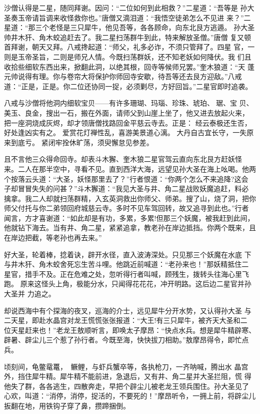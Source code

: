 沙僧认得是二星，随同拜谢。因问：“二位如何到此相救？”二星道：“吾等是
孙大圣奏玉帝请旨调来收怪救你也。”唐僧又滴泪道：“我悟空徒弟怎么不见进
来？”二星道：“那三个老怪是三只犀牛，他见吾等，各各顾命，向东北艮方逃遁。
孙大圣帅井木犴、角木蛟追赶去了。我二星扫荡群牛到此，特来解放圣僧。”唐僧
复又顿首拜谢，朝天又拜。八戒搀起道：“师父，礼多必诈，不须只管拜了。四星
官，一则是玉帝圣旨，二则是师兄人情。今既扫荡群妖，还不知老妖如何降伏。我
们且收拾些细软东西出来，掀翻此洞，以绝其根，回寺等候师兄罢。”奎木狼道：“天
蓬元帅说得有理。你与卷帘大将保护你师回寺安歇，待吾等还去艮方迎敌。”八戒
道：“正是，正是。你二位还协同一捉，必须剿尽，方好回旨。”二星官即时追袭。

八戒与沙僧将他洞内细软宝贝——有许多珊瑚、玛瑙、珍珠、琥珀、琚、宝
贝、美玉、良金，搜出一石，搬在外面，请师父到山崖上坐了，他又进去放起火来，
把一座洞烧成灰烬，却才领唐僧找路回金平慈云寺去。正是：
经云泰极还生否，好处逢凶实有之。
爱赏花灯禅性乱，喜游美景道心漓。
大丹自古宜长守，一失原来到底亏。
紧闭牢拴休旷荡，须臾懈怠见参差。

且不言他三众得命回寺。却表斗木獬、奎木狼二星官驾云直向东北艮方赶妖怪
来。二人在那半空中，寻看不见。直到西洋大海，远望见孙大圣在海上吆喝。他两
个按落云头道：“大圣，妖怪那里去了？”行者恨道：“你两个怎么不来追降?这会
子却冒冒失失的问甚？”斗木獬道：“我见大圣与井、角二星战败妖魔追赶，料必
擒拿。我二人却就扫荡群精，入玄英洞救出你师父、师弟。搜了山，烧了洞，把你
师父付托与你二弟领回府城慈云寺。多时不见车驾回转，故又追寻到此也。”行者
闻言，方才喜谢道：“如此却是有功，多累，多累!但那三个妖魔，被我赶到此间，
他就钻下海去。当有井、角二星，紧紧追拿，教老孙在岸边抵挡。你两个既来，且
在岸边把截，等老孙也再去来。”

好大圣，轮着棒，捻着诀，辟开水径，直入波涛深处。只见那三个妖魔在水底
下与井木犴、角木蛟舍死忘生苦斗哩。他跳近前喊道：“老孙来也！”那妖精抵住二
星官，措手不及。正在危难之处，忽听得行者叫喊，顾残生，拨转头往海心里飞跑。
原来这怪头上角，极能分水，只闻得花花花，冲开明路。这后边二星官并孙大圣并
力追之。

却说西海中有个探海的夜叉，巡海的介士，远见犀牛分开水势，又认得孙大圣
与二天星，即赴水晶宫对龙王慌慌张张报道：“大王!有三只犀牛，被齐天大圣和二
位天星赶来也！”老龙王敖顺听言，即唤太子摩昂：“快点水兵。想是犀牛精辟寒、
辟暑、辟尘儿三个惹了孙行者。今既至海，快快拔刀相助。”敖摩昂得令，即忙点
兵。

顷刻间，龟鳖鼋鼍，鳜鲤，与虾兵蟹卒等，各执枪刀，一齐呐喊，腾出水
晶宫外，挡住犀牛精。犀牛精不能前进，急退后，又有井、角二星并大圣拦阻，慌
得他失了群，各各逃生，四散奔走，早把个辟尘儿被老龙王领兵围住。孙大圣见了
心欢，叫道：“消停，消停，捉活的，不要死的！”摩昂听令，一拥上前，将辟尘儿
扳翻在地，用铁钩子穿了鼻，攒蹄捆倒。


